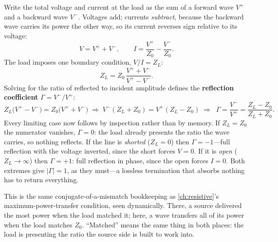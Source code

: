 Write the total voltage and current at the load as the sum of a forward wave
\(V^{+}\) and a backward wave \(V^{-}\). Voltages add; currents \emph{subtract},
because the backward wave carries its power the other way, so its current reverses
sign relative to its voltage:
\[
V=V^{+}+V^{-},
\qquad
I=\frac{V^{+}}{Z_0}-\frac{V^{-}}{Z_0}.
\]
The load imposes one boundary condition, \(V/I=Z_L\):
\[
Z_L=Z_0\,\frac{V^{+}+V^{-}}{V^{+}-V^{-}} .
\]
Solving for the ratio of reflected to incident amplitude defines the
\textbf{reflection coefficient} \(\Gamma=V^{-}/V^{+}\):
\[
Z_L\bigl(V^{+}-V^{-}\bigr)=Z_0\bigl(V^{+}+V^{-}\bigr)
\;\Rightarrow\;
V^{-}(Z_L+Z_0)=V^{+}(Z_L-Z_0)
\;\Rightarrow\;
\boxed{\;\Gamma=\frac{V^{-}}{V^{+}}=\frac{Z_L-Z_0}{Z_L+Z_0}.\;}
\]
Every limiting case now follows by inspection rather than by memory. If
\(Z_L=Z_0\) the numerator vanishes, \(\Gamma=0\): the load already presents the
ratio the wave carries, so nothing reflects. If the line is \emph{shorted}
(\(Z_L=0\)) then \(\Gamma=-1\)---full reflection with the voltage inverted, since the
short forces \(V=0\). If it is \emph{open} (\(Z_L\to\infty\)) then \(\Gamma=+1\):
full reflection in phase, since the open forces \(I=0\). Both extremes give
\(|\Gamma|=1\), as they must---a lossless termination that absorbs nothing has to
return everything.

\begin{controlsbox}
This is the same conjugate-of-a-mismatch bookkeeping as \cref{ch:resistive}'s
maximum-power-transfer condition, seen dynamically. There, a source delivered the
most power when the load matched it; here, a wave transfers all of its power when the
load matches \(Z_0\). ``Matched'' means the same thing in both places: the load is
presenting the ratio the source side is built to work into.
\end{controlsbox}

